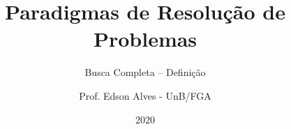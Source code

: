 \title{Paradigmas de Resolução de Problemas}
\subtitle{Busca Completa -- Definição}
\author{Prof. Edson Alves - UnB/FGA}
\date{2020}

